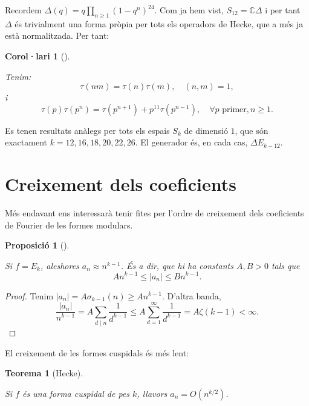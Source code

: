 \documentclass[
  letterpaper,
  DIV=11,
  numbers=noendperiod]{scrreprt}
\theoremstyle{plain}
\newtheorem{theorem}{Teorema}[chapter]
\theoremstyle{plain}
\newtheorem{corollary}{Corol·lari}[chapter]
\theoremstyle{definition}
\theoremstyle{plain}
\newtheorem{proposition}{Proposició}[chapter]
\theoremstyle{plain}
\theoremstyle{definition}
\theoremstyle{remark}
\begin{document}
Recordem \(\Delta(q)=q\prod_{n\geq 1} (1-q^n)^{24}\). Com ja hem vist,
\(S_{12}=\mathbb{C}\Delta\) i per tant \(\Delta\) és trivialment una
forma pròpia per tots els operadors de Hecke, que a més ja està
normalitzada. Per tant:

\begin{corollary}[]\protect\hypertarget{cor-}{}\label{cor-}

Tenim: \[
\tau(nm)=\tau(n)\tau(m),\quad (n,m)=1,
\] i \[
\tau(p)\tau(p^n) = \tau(p^{n+1})+p^{11}\tau(p^{n-1}),\quad \forall p\text{ primer}, n\geq 1.
\]

\end{corollary}

Es tenen resultats anàlegs per tots els espais \(S_k\) de dimensió
\(1\), que són exactament \(k=12,16,18,20,22,26\). El generador és, en
cada cas, \(\Delta E_{k-12}\).

\section{Creixement dels coeficients}\label{creixement-dels-coeficients}

Més endavant ens interessarà tenir fites per l'ordre de creixement dels
coeficients de Fourier de les formes modulars.

\begin{proposition}[]\protect\hypertarget{prp-}{}\label{prp-}

Si \(f=E_k\), aleshores \(a_n\approx n^{k-1}\). És a dir, que hi ha
constants \(A, B>0\) tals que \[
An^{k-1}\leq |a_n|\leq Bn^{k-1}.
\]

\end{proposition}

\begin{proof}
Tenim \(|a_n| = A \sigma_{k-1}(n)\geq An^{k-1}\). D'altra banda, \[
\frac{|a_n|}{n^{k-1}} = A \sum_{d\mid n} \frac{1}{d^{k-1}} \leq A\sum_{d=1}^\infty \frac{1}{d^{k-1}} = A\zeta(k-1) < \infty.
\]
\end{proof}

El creixement de les formes cuspidals és més lent:

\begin{theorem}[Hecke]\protect\hypertarget{thm-hecke}{}\label{thm-hecke}

Si \(f\) és una forma cuspidal de pes \(k\), llavors \(a_n=O(n^{k/2})\).

\end{theorem}
\end{document}
